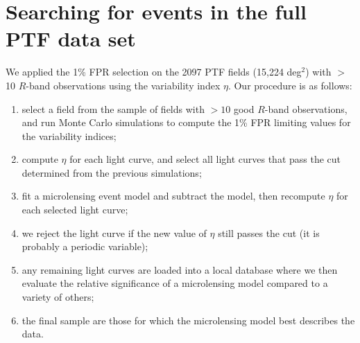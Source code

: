 \documentclass{emulateapj}
\newcommand{\apwsim}{\raisebox{0.2ex}{\scriptsize$\sim$\normalsize}}
\begin{document}


\section{Searching for events in the full PTF data set}

We applied the 1\% FPR selection on the 2097 PTF fields (\apwsim15,224 deg$^2$) with $>$10 $R$-band observations using the variability index $\eta$. Our procedure is as follows:
\begin{enumerate}
	\item select a field from the sample of fields with $>10$ good $R$-band observations, and run Monte Carlo simulations to compute the 1\% FPR limiting values for the variability indices;
	\item compute $\eta$ for each light curve, and select all light curves that pass the cut determined from the previous simulations;
	\item fit a microlensing event model and subtract the model, then recompute $\eta$ for each selected light curve;
	\item we reject the light curve if the new value of $\eta$ still passes the cut (it is probably a periodic variable);
	\item any remaining light curves are loaded into a local database where we then evaluate the relative significance of a microlensing model compared to a variety of others;
	\item the final sample are those for which the microlensing model best describes the data.
\end{enumerate}
\end{document}
